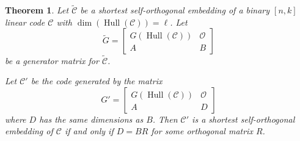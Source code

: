\documentclass{article}
\newtheorem{theorem}{Theorem}[section]
\theoremstyle{definition}
\theoremstyle{remark}
\begin{document}
\begin{theorem}\label{ortho-gene}
    Let $\tilde{\mathcal{C}}$ be a shortest self-orthogonal embedding of a binary $[n, k]$ linear code $\mathcal{C}$ with $\dim(\operatorname{Hull}(\mathcal{C}))=\ell$. Let 
    \[
    \tilde{G} = \begin{bmatrix}
        G(\operatorname{Hull}(\mathcal{C})) & \mathcal{O} \\A & B
    \end{bmatrix}
    \]
    be a generator matrix for $\tilde{\mathcal{C}}$.  

    Let $\mathcal{C}'$ be the code generated by the matrix 
    \[
    G' = \begin{bmatrix}
        G(\operatorname{Hull}(\mathcal{C})) & \mathcal{O} \\A & D
    \end{bmatrix}
    \]
    where $D$ has the same dimensions as $B$.  Then $\mathcal{C}'$ is a shortest self-orthogonal embedding of $\mathcal{C}$ if and only if $D = BR$ for some orthogonal matrix $R$.
\end{theorem}
\end{document}
